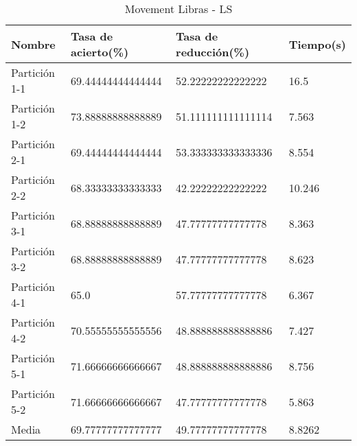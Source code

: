 \begin{table}[H]
	\centering
	\caption{Movement Libras - LS}
	\label{MLIB-LS}
	\begin{tabular}{l|lll}
		Nombre        & Tasa de acierto(\%) & Tasa de reducción(\%) & Tiempo(s) \\ \hline
		Partición 1-1 & 69.44444444444444   & 52.22222222222222     & 16.5      \\
		Partición 1-2 & 73.88888888888889   & 51.111111111111114    & 7.563     \\
		Partición 2-1 & 69.44444444444444   & 53.333333333333336    & 8.554     \\
		Partición 2-2 & 68.33333333333333   & 42.22222222222222     & 10.246    \\
		Partición 3-1 & 68.88888888888889   & 47.77777777777778     & 8.363     \\
		Partición 3-2 & 68.88888888888889   & 47.77777777777778     & 8.623     \\
		Partición 4-1 & 65.0                & 57.77777777777778     & 6.367     \\
		Partición 4-2 & 70.55555555555556   & 48.888888888888886    & 7.427     \\
		Partición 5-1 & 71.66666666666667   & 48.888888888888886    & 8.756     \\
		Partición 5-2 & 71.66666666666667   & 47.77777777777778     & 5.863     \\ \hline
		Media         & 69.77777777777777   & 49.77777777777778     & 8.8262   
	\end{tabular}
\end{table}